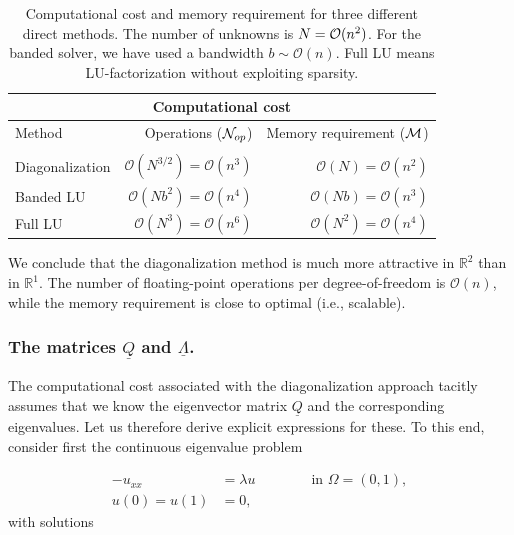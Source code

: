 \documentclass[11pt]{article}
\begin{document}
\begin{table}[h]
  \begin{center}
    \begin{tabular}{|l|r|r|}
      \hline
      \multicolumn{3}{|c|}{Computational cost }\\
      \hline
      Method & Operations (${\cal N}_{op}$) & Memory requirement (${\cal M}$) \\
      \hline
       & & \\
      Diagonalization & $\mathcal{O}(N^{3/2}) = \mathcal{O}(n^3)$ & $\mathcal{O}(N) = \mathcal{O}(n^2)$ \\
      Banded LU & $\mathcal{O}(N b^2) = \mathcal{O}(n^4)$ & $\mathcal{O}(Nb) = \mathcal{O}(n^3)$\\
      Full LU & $\mathcal{O}(N^3) = \mathcal{O}(n^6)$ & $\mathcal{O}(N^2) = \mathcal{O}(n^4)$ \\
      \hline
    \end{tabular}
    \caption{Computational cost and memory requirement for three different 
    direct methods. The number of unknowns is $N={\cal O}(n^2)$.
    For the banded solver, we have used a bandwidth  $b \sim \mathcal{O}(n)$.
    Full LU means LU-factorization without exploiting sparsity.
    }
    \label{tab:DirectMethods_ComputationalCost}
  \end{center}
\end{table}

We conclude that the diagonalization method is much more attractive in $\mathbb{R}^2$ than in $\mathbb{R}^1$.
The number of floating-point operations per degree-of-freedom is $\mathcal{O}(n)$, while the memory requirement is close to optimal (i.e., scalable).


\subsubsection{The matrices $\underline{{Q}}$ and $\underline{{\Lambda}}$.}

The computational cost associated with the diagonalization approach 
tacitly assumes that we know the eigenvector matrix $\underline{Q}$ 
and the corresponding eigenvalues. 
Let us therefore derive explicit expressions for these. 
To this end, consider first the continuous eigenvalue problem

\begin{equation*}
  \begin{split}
    -u_{xx} &= \lambda u \qquad \qquad \text{in } \Omega=(0,1), \\
    u(0) = u(1) &= 0,
  \end{split}
\end{equation*}
with solutions
\end{document}
